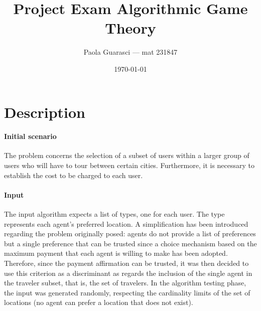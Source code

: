 \documentclass{article}
\title{Project Exam Algorithmic Game Theory}
\author{Paola Guarasci --- mat 231847}
\date{\today}
\begin{document}
\maketitle


\section*{Description}
\paragraph*{Initial scenario}
The problem concerns the selection of a subset of users within a larger group of users who will have to tour between certain cities. Furthermore, it is necessary to establish the cost to be charged to each user.
\paragraph*{Input}
The input algorithm expects a list of types, one for each user. The type represents each agent's preferred location. A simplification has been introduced regarding the problem originally posed: agents do not provide a list of preferences but a single preference that can be trusted since a choice mechanism based on the maximum payment that each agent is willing to make has been adopted. Therefore, since the payment affirmation can be trusted, it was then decided to use this criterion as a discriminant as regards the inclusion of the single agent in the traveler subset, that is, the set of travelers.
In the algorithm testing phase, the input was generated randomly, respecting the cardinality limits of the set of locations (no agent can prefer a location that does not exist).
\end{document}
